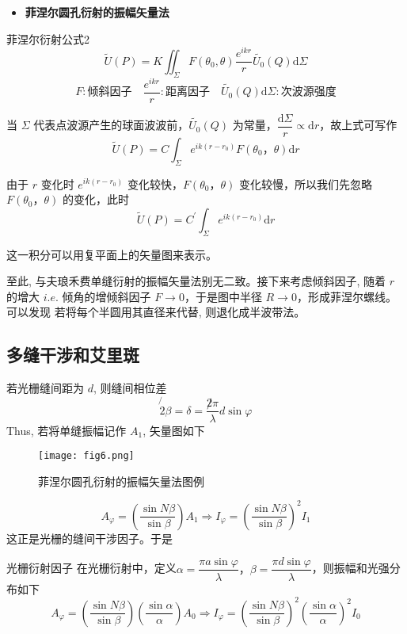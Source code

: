 \begin{itemize} 
	\item \textbf{菲涅尔圆孔衍射的振幅矢量法}
\end{itemize}
\begin{mythm}{菲涅尔衍射公式}{2}
	\[
		\widetilde{U}(P)=K\iint_{\Sigma}{F\left( \theta _0,\theta \right) \frac{e^{ikr}}{r}\widetilde{U_0}(Q)\mathrm{d}\Sigma}
	\]
	\[
	F: \text{倾斜因子} \quad   \frac{e^{ikr}}{r}: \text{距离因子}\quad  \widetilde{U_0}(Q) \mathrm{d}\Sigma : \text{次波源强度}
	\]
\end{mythm}
\par 当 $\Sigma$ 代表点波源产生的球面波波前，$\widetilde{U_0}(Q)$ 为常量，$\dfrac{\mathrm{d} \Sigma}{r} \propto \mathrm{d} r$，故上式可写作
\[
\widetilde{U}(P)=C \int_{\Sigma} e^{i k\left(r-r_0\right)} F\left(\theta_0，\theta\right) \mathrm{d} r
\]
\par 由于 $r$ 变化时 $e^{i k\left(r-r_0\right)}$ 变化较快，$F\left(\theta_0，\theta\right)$ 变化较慢，所以我们先忽略 $F\left(\theta_0，\theta\right)$ 的变化，此时
\[
\widetilde{U}(P)=C^{\prime} \int_{\Sigma} e^{i k\left(r-r_0\right)} \mathrm{d} r
\]
\par 这一积分可以用复平面上的矢量图来表示。
\par

\par 至此, 与夫琅禾费单缝衍射的振幅矢量法别无二致。接下来考虑倾斜因子, 随着 $r$ 的增大 $i.e$.
倾角的增倾斜因子 $F \rightarrow 0$，于是图中半径 $R \rightarrow 0$，形成菲涅尔螺线。 可以发现 若将每个半圆用其直径来代替, 则退化成半波带法。


\subsection{多缝干涉和艾里斑}
若光栅缝间距为 $d$, 则缝间相位差
$$
\not{2} \beta=\delta=\frac{\not 2 \pi}{\lambda} d \sin \varphi
$$
Thus, 若将单缝振幅记作 $A_1$, 矢量图如下
\begin{figure}[!htp]
	\centering
	\texttt{[image: fig6.png]}
	\caption{菲涅尔圆孔衍射的振幅矢量法图例}
\end{figure}
$$
A_{\varphi}=\left(\frac{\sin N \beta}{\sin \beta}\right) A_1 \Rightarrow I_{\varphi}=\left(\frac{\sin N \beta}{\sin \beta}\right)^2 I_1
$$
这正是光栅的缝间干涉因子。于是
\begin{myprop}{ 光栅衍射因子}{}
	在光栅衍射中，定义$\alpha=\dfrac{\pi a\sin \varphi}{\lambda}，\beta=\dfrac{\pi d\sin \varphi}{\lambda}$，则振幅和光强分布如下
	\[
		A_{\varphi}=\left(\frac{\sin N \beta}{\sin \beta}\right)\left(\frac{\sin \alpha}{\alpha}\right) A_0 \Rightarrow I_{\varphi}=\left(\frac{\sin N \beta}{\sin \beta}\right)^2\left(\frac{\sin \alpha}{\alpha}\right)^2 I_0
	\]
\end{myprop}

